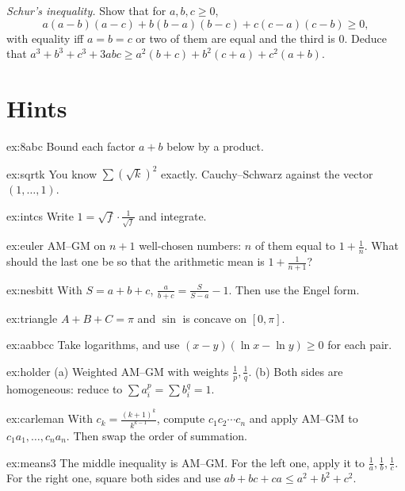 \begin{exercise}[$\star\star\star$]\label{ex:schur}
\emph{Schur's inequality.} Show that for $a,b,c\ge0$,
\[
a(a-b)(a-c)+b(b-a)(b-c)+c(c-a)(c-b)\ge0,
\]
with equality iff $a=b=c$ or two of them are equal and the third is $0$. Deduce that $a^3+b^3+c^3+3abc\ge a^2(b+c)+b^2(c+a)+c^2(a+b)$.
\end{exercise}

\section{Hints}

\begin{hint}{ex:8abc}
Bound each factor $a+b$ below by a product.
\end{hint}
\begin{hint}{ex:sqrtk}
You know $\sum(\sqrt k)^2$ exactly. Cauchy--Schwarz against the vector $(1,\dots,1)$.
\end{hint}
\begin{hint}{ex:intcs}
Write $1=\sqrt f\cdot\frac1{\sqrt f}$ and integrate.
\end{hint}
\begin{hint}{ex:euler}
AM--GM on $n+1$ well-chosen numbers: $n$ of them equal to $1+\frac1n$. What should the last one be so that the arithmetic mean is $1+\frac1{n+1}$?
\end{hint}
\begin{hint}{ex:nesbitt}
With $S=a+b+c$, $\frac a{b+c}=\frac S{S-a}-1$. Then use the Engel form.
\end{hint}
\begin{hint}{ex:triangle}
$A+B+C=\pi$ and $\sin$ is concave on $[0,\pi]$.
\end{hint}
\begin{hint}{ex:aabbcc}
Take logarithms, and use $(x-y)(\ln x-\ln y)\ge0$ for each pair.
\end{hint}
\begin{hint}{ex:holder}
(a) Weighted AM--GM with weights $\frac1p,\frac1q$. (b) Both sides are homogeneous: reduce to $\sum a_i^p=\sum b_i^q=1$.
\end{hint}
\begin{hint}{ex:carleman}
With $c_k=\frac{(k+1)^k}{k^{k-1}}$, compute $c_1c_2\cdots c_n$ and apply AM--GM to $c_1a_1,\dots,c_na_n$. Then swap the order of summation.
\end{hint}
\begin{hint}{ex:means3}
The middle inequality is AM--GM. For the left one, apply it to $\frac1a,\frac1b,\frac1c$. For the right one, square both sides and use $ab+bc+ca\le a^2+b^2+c^2$.
\end{hint}
